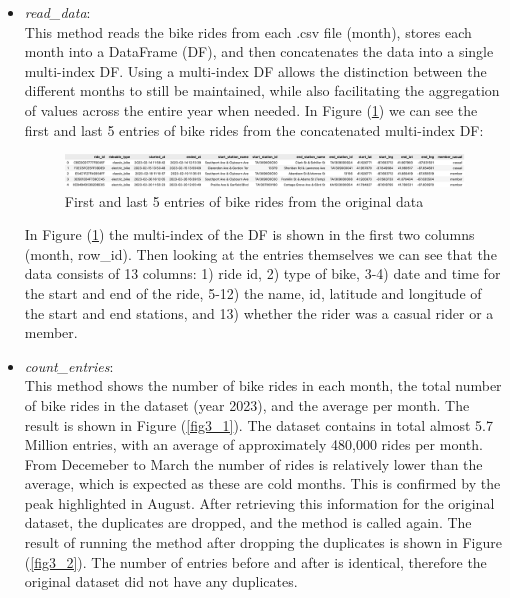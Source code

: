 \documentclass[12pt]{article}
\begin{document}
\begin{itemize}
	\item \textit{read\_data}:\\
	This method reads the bike rides from each .csv file (month), stores each month into a DataFrame (DF), and then concatenates the data into a single multi-index DF. Using a multi-index DF allows the distinction between the different months to still be maintained, while also facilitating the aggregation of values across the entire year when needed. In Figure (\ref{fig1}) we can see the first and last 5 entries of bike rides from the concatenated multi-index DF:

	\begin{figure}[h]
	\hspace{-1.1cm}
	\includegraphics[scale=0.45]{img1.png}
	\caption{First and last 5 entries of bike rides from the original data}
	\label{fig1}
	\end{figure}
	\pagebreak
	
	In Figure (\ref{fig1}) the multi-index of the DF is shown in the first two columns (month, row\_id). Then looking at the entries themselves we can see that the data consists of 13 columns: 1) ride id, 2) type of bike, 3-4) date and time for the start and end of the ride, 5-12) the name, id, latitude and longitude of the start and end stations, and 13) whether the rider was a casual rider or a member.  \\
	
	\item \textit{count\_entries}:\\
	This method shows the number of bike rides in each month, the total number of bike rides in the dataset (year 2023), and the average per month. The result is shown in Figure (\ref{fig3_1}). The dataset contains in total almost 5.7 Million entries, with an average of approximately 480,000 rides per month. From Decemeber to March the number of rides is relatively lower than the average, which is expected as these are cold months. This is confirmed by the peak highlighted in August. After retrieving this information for the original dataset, the duplicates are dropped, and the method is called again. The result of running the method after dropping the duplicates is shown in Figure (\ref{fig3_2}). The number of entries before and after is identical, therefore the original dataset did not have any duplicates.\\ 
	

\end{itemize}
\end{document}
